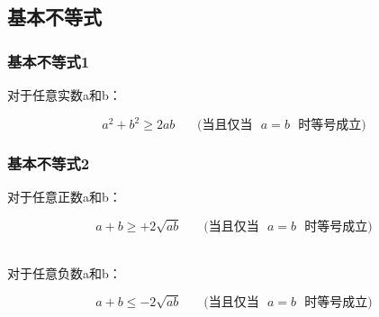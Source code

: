 \documentclass[UTF8]{ctexart}
\begin{document}
\subsection{基本不等式}

\subsubsection{基本不等式1}
    对于任意实数a和b：
    \begin{large}
        \begin{equation*}
            a^2+b^2\ge 2ab~~~~~~~~\text{(当且仅当~~}a=b\text{~~时等号成立)}
        \end{equation*}
    \end{large}

\subsubsection{基本不等式2}
    对于任意正数a和b：
    \begin{large}
        \begin{equation*}
            a+b\ge +2\sqrt{ab}~~~~~~~~\text{(当且仅当~~}a=b\text{~~时等号成立)}
        \end{equation*}
    \end{large}\\
    对于任意负数a和b：
    \begin{large}
        \begin{equation*}
            a+b\le -2\sqrt{ab}~~~~~~~~\text{(当且仅当~~}a=b\text{~~时等号成立)}
        \end{equation*}
    \end{large}

\newpage
\end{document}
